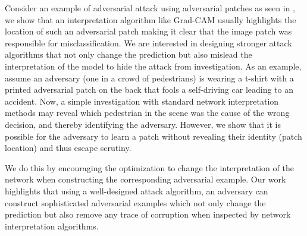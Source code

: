 \documentclass[10pt,twocolumn,letterpaper]{article}
\begin{document}


Consider an example of adversarial attack using adversarial patches as seen in \cite{brown2017adversarial}, we show that an interpretation algorithm like Grad-CAM \cite{selvaraju2016grad} usually highlights the location of such an adversarial patch making it clear that the image patch was responsible for misclassification. We are interested in designing stronger attack algorithms that not only change the prediction but also mislead the interpretation of the model to hide the attack from investigation. As an example, assume an adversary (one in a crowd of pedestrians) is wearing a t-shirt with a printed adversarial patch on the back that fools a self-driving car leading to an accident. Now, a simple investigation with standard network interpretation methods may reveal which pedestrian in the scene was the cause of the wrong decision, and thereby identifying the adversary. However, we show that it is possible for the adversary to learn a patch without revealing their identity (patch location) and thus escape scrutiny.

We do this by encouraging the optimization to change the interpretation of the network when constructing the corresponding adversarial example. Our work highlights that using a well-designed attack algorithm, an adversary can construct sophisticated adversarial examples which not only change the prediction but also remove any trace of corruption when inspected by network interpretation algorithms.
\end{document}
